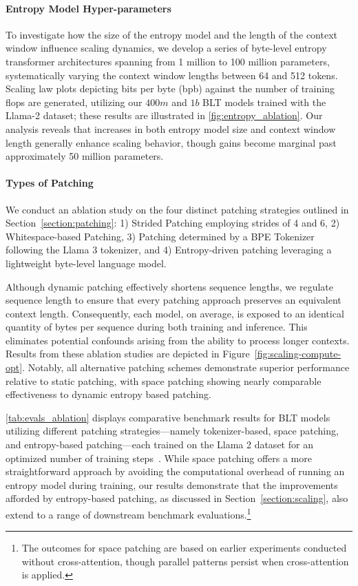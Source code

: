 \paragraph{Entropy Model Hyper-parameters} To investigate how the size of the entropy model and the length of the context window influence scaling dynamics, we develop a series of byte-level entropy transformer architectures spanning from 1 million to 100 million parameters, systematically varying the context window lengths between 64 and 512 tokens. Scaling law plots depicting bits per byte (bpb) against the number of training flops are generated, utilizing our $400m$ and $1b$ {\textsc BLT} models trained with the Llama-2 dataset; these results are illustrated in \autoref{fig:entropy_ablation}. Our analysis reveals that increases in both entropy model size and context window length generally enhance scaling behavior, though gains become marginal past approximately 50 million parameters.

\paragraph{Types of Patching}

We conduct an ablation study on the four distinct patching strategies outlined in Section~\ref{section:patching}: 1) Strided Patching employing strides of 4 and 6, 2) Whitespace-based Patching, 3) Patching determined by a BPE Tokenizer following the Llama 3 tokenizer, and 4) Entropy-driven patching leveraging a lightweight byte-level language model.

Although dynamic patching effectively shortens sequence lengths, we regulate sequence length to ensure that every patching approach preserves an equivalent context length. Consequently, each model, on average, is exposed to an identical quantity of bytes per sequence during both training and inference. This eliminates potential confounds arising from the ability to process longer contexts. Results from these ablation studies are depicted in Figure~\ref{fig:scaling-compute-opt}. Notably, all alternative patching schemes demonstrate superior performance relative to static patching, with space patching showing nearly comparable effectiveness to dynamic entropy based patching.

\autoref{tab:evals_ablation} displays comparative benchmark results for {\textsc BLT} models utilizing different patching strategies—namely tokenizer-based, space patching, and entropy-based patching—each trained on the Llama 2 dataset for an optimized number of training steps~\citep{dubey2024llama}. While space patching offers a more straightforward approach by avoiding the computational overhead of running an entropy model during training, our results demonstrate that the improvements afforded by entropy-based patching, as discussed in Section~\ref{section:scaling}, also extend to a range of downstream benchmark evaluations.\footnote{The outcomes for space patching are based on earlier experiments conducted without cross-attention, though parallel patterns persist when cross-attention is applied.}

